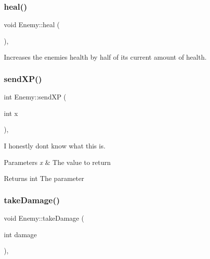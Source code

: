 \subsubsection{\texorpdfstring{heal()}{heal()}}
{\footnotesize\ttfamily void Enemy\+::heal (\begin{DoxyParamCaption}{ }\end{DoxyParamCaption})\hspace{0.3cm}{\ttfamily [protected]}, {\ttfamily [virtual]}}



Increases the enemies health by half of it\textquotesingle{}s current amount of health. 

\mbox{\label{classEnemy_a755e7d44eb291517f28e9cad2c6c7111}} 
\subsubsection{\texorpdfstring{sendXP()}{sendXP()}}
{\footnotesize\ttfamily int Enemy\+::send\+XP (\begin{DoxyParamCaption}\item[{int}]{x }\end{DoxyParamCaption})\hspace{0.3cm}{\ttfamily [protected]}, {\ttfamily [virtual]}}



I honestly don\textquotesingle{}t know what this is. 


\begin{DoxyParams}{Parameters}
{\em x} & The value to return \\
\hline
\end{DoxyParams}
\begin{DoxyReturn}{Returns}
int The parameter 
\end{DoxyReturn}
\mbox{\label{classEnemy_ae01c62a474fbcd547000ff1068976d49}} 
\subsubsection{\texorpdfstring{takeDamage()}{takeDamage()}}
{\footnotesize\ttfamily void Enemy\+::take\+Damage (\begin{DoxyParamCaption}\item[{int}]{damage }\end{DoxyParamCaption})\hspace{0.3cm}{\ttfamily [protected]}, {\ttfamily [virtual]}}



